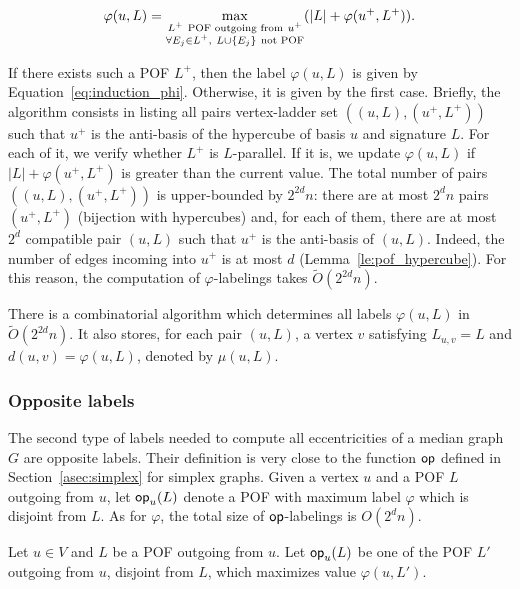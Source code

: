 \documentclass[a4paper,UKenglish,numberwithinsect,cleveref, autoref]{lipics-v2021}
\newcommand{\set}[1]{\left\{ #1 \right\}}
\newcommand{\card}[1]{\left| #1 \right|}
\newcommand{\opp}{\mbox{\textsf{op}}}
\begin{document}
\begin{equation}
    \varphi(u,L) = \max\limits_{\substack{L^+ ~\mbox{\scriptsize{POF outgoing from}}~ u^+ \\ \forall E_j \in L^+,~ L \cup \set{E_j} ~\mbox{\scriptsize{not POF}}}} (\card{L} + \varphi(u^+,L^+)).
\label{eq:induction_phi}
\end{equation}

If there exists such a POF $L^+$, then the label $\varphi(u,L)$ is given by Equation~\eqref{eq:induction_phi}. Otherwise, it is given by the first case. Briefly, the algorithm consists in listing all pairs vertex-ladder set $((u,L),(u^+,L^+))$ such that $u^+$ is the anti-basis of the hypercube of basis $u$ and signature $L$. For each of it, we verify whether $L^+$ is $L$-parallel. If it is, we update $\varphi(u,L)$ if $\card{L} + \varphi(u^+,L^+)$ is greater than the current value. The total number of pairs $((u,L),(u^+,L^+))$ is upper-bounded by $2^{2d}n$: there are at most $2^dn$ pairs $(u^+,L^+)$ (bijection with hypercubes) and, for each of them, there are at most $2^d$ compatible pair $(u,L)$ such that $u^+$ is the anti-basis of $(u,L)$. Indeed, the number of edges incoming into $u^+$ is at most $d$ (Lemma~\ref{le:pof_hypercube}). For this reason, the computation of $\varphi$-labelings takes $\tilde{O}(2^{2d}n)$.

\begin{theorem}
There is a combinatorial algorithm which determines all labels $\varphi(u,L)$ in $\tilde{O}(2^{2d}n)$. It also stores, for each pair $(u,L)$, a vertex $v$ satisfying $L_{u,v} = L$ and $d(u,v) = \varphi(u,L)$, denoted by $\mu(u,L)$.
\label{th:compute_phi}
\end{theorem}

\subsubsection{Opposite labels}

The second type of labels needed to compute all eccentricities of a median graph $G$ are opposite labels. Their definition is very close to the function $\opp$ defined in Section~\ref{asec:simplex} for simplex graphs. Given a vertex $u$ and a POF $L$ outgoing from $u$, let $\opp_u(L)$ denote a POF with maximum label $\varphi$ which is disjoint from $L$. As for $\varphi$, the total size of $\opp$-labelings is $O(2^dn)$.

\begin{definition}[Labels $\opp$~\cite{BeHa21}]
Let $u \in V$ and $L$ be a POF outgoing from $u$. Let $\opp_u(L)$ be one of the POF $L'$ outgoing from $u$, disjoint from $L$, which maximizes value $\varphi(u,L')$.
\end{definition}
\end{document}
